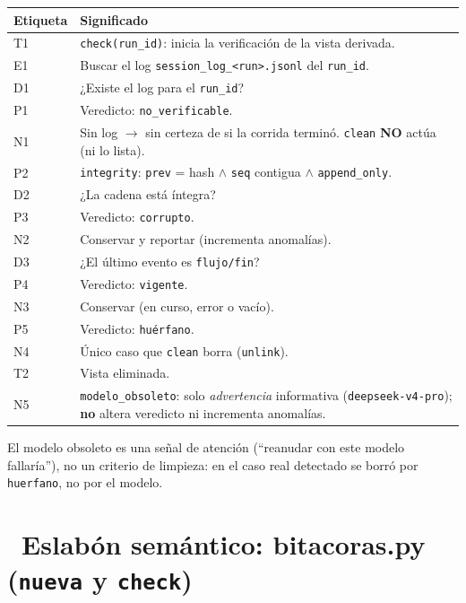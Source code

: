 \documentclass[11pt,a4paper]{article}
\newcommand{\iconotexto}[2]{\textcolor{cyanNeon}{\faIcon{#1}}~#2}
\begin{document}
\begin{center}
\vspace{6pt}
\begin{tcolorbox}[cajaContenido, title={\faIcon{table}~Leyenda de etiquetas}]
\small
\begin{tabularx}{\linewidth}{@{}>{\centering\arraybackslash}p{1.4cm}X@{}}
\toprule
\textbf{Etiqueta} & \textbf{Significado} \\ \midrule
T1 & \texttt{check(run\_id)}: inicia la verificación de la vista derivada. \\
E1 & Buscar el log \texttt{session\_log\_<run>.jsonl} del \texttt{run\_id}. \\
D1 & ¿Existe el log para el \texttt{run\_id}? \\
P1 & Veredicto: \texttt{no\_verificable}. \\
N1 & Sin log $\rightarrow$ sin certeza de si la corrida terminó. \texttt{clean} \textbf{NO} actúa (ni lo lista). \\
P2 & \texttt{integrity}: \texttt{prev} = hash $\wedge$ \texttt{seq} contigua $\wedge$ \texttt{append\_only}. \\
D2 & ¿La cadena está íntegra? \\
P3 & Veredicto: \texttt{corrupto}. \\
N2 & Conservar y reportar (incrementa anomalías). \\
D3 & ¿El último evento es \texttt{flujo/fin}? \\
P4 & Veredicto: \texttt{vigente}. \\
N3 & Conservar (en curso, error o vacío). \\
P5 & Veredicto: \texttt{huérfano}. \\
N4 & Único caso que \texttt{clean} borra (\texttt{unlink}). \\
T2 & Vista eliminada. \\
N5 & \texttt{modelo\_obsoleto}: solo \emph{advertencia} informativa (\texttt{deepseek-v4-pro}); \textbf{no} altera veredicto ni incrementa anomalías. \\
\bottomrule
\end{tabularx}
\end{tcolorbox}
\end{center}

El modelo obsoleto es una señal de atención (``reanudar con este modelo fallaría''), no
un criterio de limpieza: en el caso real detectado se borró por \texttt{huerfano}, no por
el modelo.

\section{\iconotexto{book}{Eslabón semántico: bitacoras.py (\texttt{nueva} y \texttt{check})}}
\end{document}

